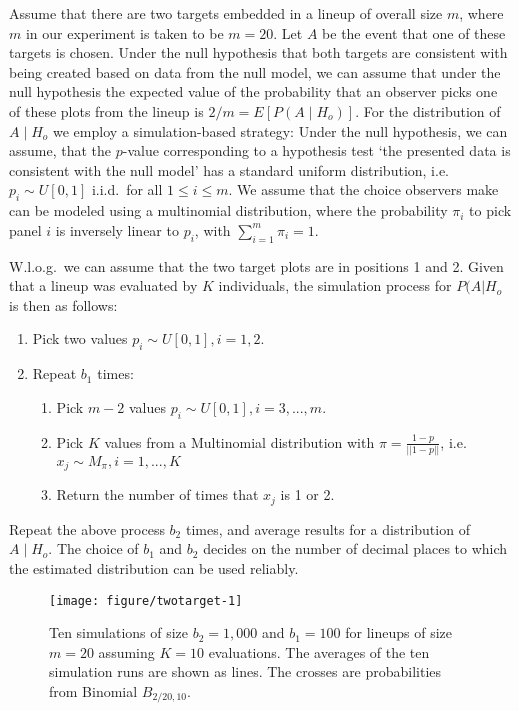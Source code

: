 \documentclass[12pt]{article}\usepackage[]{graphicx}\usepackage[]{color}
\newenvironment{knitrout}{}{} %
\begin{document}
\begin{appendix}
Assume that there are two targets embedded in a lineup of overall size $m$, where $m$ in our experiment is taken to be $m=20$. Let $A$ be the event that one of these targets is chosen.
Under the null hypothesis that both targets are consistent with being created based on data from the null model, we can assume that under the null hypothesis the expected value of the probability that an observer picks one of these plots from the lineup is $2/m = E[ P(A \mid H_o) ]$.
For the distribution of $A \mid H_o$ we employ a simulation-based strategy:
Under the null hypothesis, we can assume, that the $p$-value corresponding to a hypothesis test `the presented data is consistent with the null model' has a standard uniform distribution, i.e. $p_i \sim U[0,1]$ i.i.d.~for all $1 \le i \le m$. We assume that the choice observers make can be modeled using a multinomial distribution, where the probability $\pi_i$ to pick panel $i$ is inversely linear to $p_i$, with $\sum_{i=1}^m \pi_i = 1$.
 
W.l.o.g.~we can assume that the two target plots are in positions 1 and 2. 
Given that a lineup was evaluated by $K$ individuals, the simulation process for $P(A|H_o$ is then as follows:
%
\begin{enumerate}
\item Pick two values $p_i \sim U[0,1], i=1, 2$.
\item Repeat $b_1$ times:
\begin{enumerate}
    \item Pick $m-2$ values $p_i \sim U[0,1], i=3, ..., m$.
    \item Pick $K$ values from a Multinomial distribution with $\pi = \frac{1-p}{|| 1- p||}$, i.e. $x_j \sim M_\pi, i=1, ..., K$
    \item Return the number of times that $x_j$ is 1 or 2. 
\end{enumerate} 
\end{enumerate}
Repeat the above process $b_2$ times, and average results for a distribution of $A \mid H_o$. 
The choice of $b_1$ and $b_2$ decides on the number of decimal places to which the estimated distribution can be used reliably. 

\begin{figure}

\begin{knitrout}
\color{fgcolor}

{\centering \texttt{[image: figure/twotarget-1]} 

}



\end{knitrout}
\caption{\label{fig:simulation} Ten simulations of size $b_2 = 1,000$ and $b_1 = 100$ for lineups of size $m=20$ assuming $K=10$ evaluations. The averages of the ten simulation runs are shown as lines. The crosses are probabilities from  Binomial $B_{2/20, 10}$.}
\end{figure}
\end{appendix}
\end{document}
